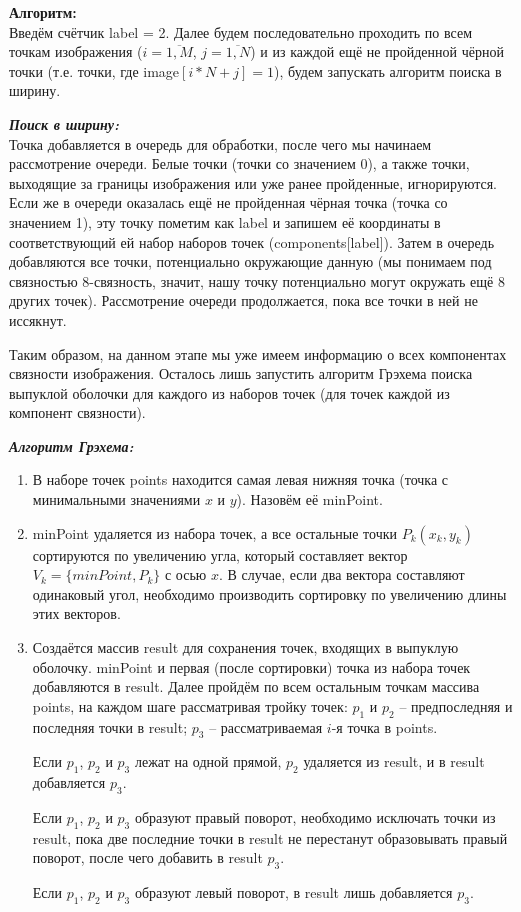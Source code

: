\documentclass[14pt, russian]{extarticle}
\begin{document}
	\noindent\textbf{Алгоритм:}\\
	\indent Введём счётчик label = 2. Далее будем последовательно проходить по всем точкам изображения ($ i = \overline{1,M} $, $ j = \overline{1,N} $) и из каждой ещё не пройденной чёрной точки (т.е. точки, где image$[i * N + j] = 1 $), будем запускать алгоритм поиска в ширину.
	
	\noindent \textit{\textbf{Поиск в ширину:}}\\
	\indent Точка добавляется в очередь для обработки, после чего мы начинаем рассмотрение очереди. Белые точки (точки со значением 0), а также точки, выходящие за границы изображения или уже ранее пройденные, игнорируются. Если же в очереди оказалась ещё не пройденная чёрная точка (точка со значением 1), эту точку пометим как label и запишем её координаты в соответствующий ей набор наборов точек (components[label]). Затем в очередь добавляются все точки, потенциально окружающие данную (мы понимаем под связностью 8-связность, значит, нашу точку потенциально могут окружать ещё 8 других точек). Рассмотрение очереди продолжается, пока все точки в ней не иссякнут.
	
	Таким образом, на данном этапе мы уже имеем информацию о всех компонентах связности изображения. Осталось лишь запустить алгоритм Грэхема поиска выпуклой оболочки для каждого из наборов точек (для точек каждой из компонент связности).
	
	\noindent \textit{\textbf{Алгоритм Грэхема:}}
	\begin{enumerate}[topsep=0pt, labelwidth=!, labelindent=0pt]
		\item В наборе точек points находится самая левая нижняя точка (точка с минимальными значениями $ x $ и $ y $). Назовём её minPoint.
		\item minPoint удаляется из набора точек, а все остальные точки $ P_k(x_k, y_k) $ сортируются по увеличению угла, который составляет вектор\\
		$ V_k = \{ minPoint, P_k \} $ с осью $ x $. В случае, если два вектора составляют одинаковый угол, необходимо производить сортировку по увеличению длины этих векторов.
		\item Создаётся массив result для сохранения точек, входящих в выпуклую оболочку. minPoint и первая (после сортировки) точка из набора точек добавляются в result. Далее пройдём по всем остальным точкам массива points, на каждом шаге рассматривая тройку точек:
		$ p_1 $ и $ p_2 $ – предпоследняя и последняя точки в result; $ p_3 $ – рассматриваемая $i$-я точка в points.
		
		Если $ p_1 $, $ p_2 $ и $ p_3 $ лежат на одной прямой, $ p_2 $ удаляется из result, и в result добавляется $ p_3 $.
		
		Если $ p_1 $, $ p_2 $ и $ p_3 $ образуют правый поворот, необходимо исключать точки из result, пока две последние точки в result не перестанут образовывать правый поворот, после чего добавить в result $ p_3 $.
		
		Если $ p_1 $, $ p_2 $ и $ p_3 $ образуют левый поворот, в result лишь добавляется $ p_3 $.
	\end{enumerate}
\end{document}
